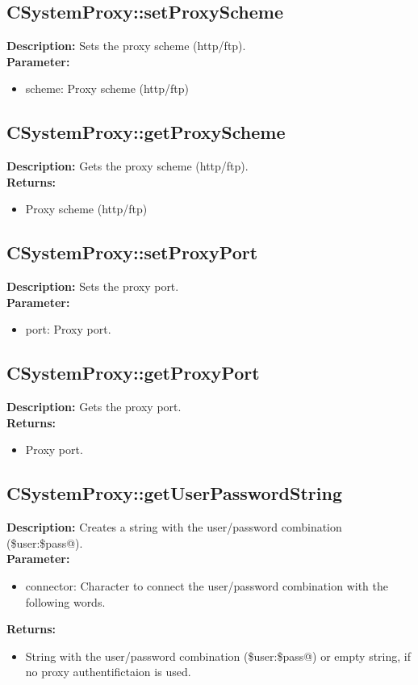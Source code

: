 \subsection{CSystemProxy::setProxyScheme}
\textbf{Description:} Sets the proxy scheme (http/ftp).\\
\textbf{Parameter:}
\begin{itemize}
\item scheme: Proxy scheme (http/ftp)
\end{itemize}

\subsection{CSystemProxy::getProxyScheme}
\textbf{Description:} Gets the proxy scheme (http/ftp).\\
\textbf{Returns:}
\begin{itemize}
\item Proxy scheme (http/ftp)
\end{itemize}

\subsection{CSystemProxy::setProxyPort}
\textbf{Description:} Sets the proxy port.\\
\textbf{Parameter:}
\begin{itemize}
\item port: Proxy port.
\end{itemize}

\subsection{CSystemProxy::getProxyPort}
\textbf{Description:} Gets the proxy port.\\
\textbf{Returns:}
\begin{itemize}
\item Proxy port.
\end{itemize}

\subsection{CSystemProxy::getUserPasswordString}
\textbf{Description:} Creates a string with the user/password combination (\$user:\$pass@).\\
\textbf{Parameter:}
\begin{itemize}
\item connector: Character to connect the user/password combination with the following words.
\end{itemize}
\textbf{Returns:}
\begin{itemize}
\item String with the user/password combination (\$user:\$pass@) or empty string, if no proxy authentifictaion is used.
\end{itemize}

